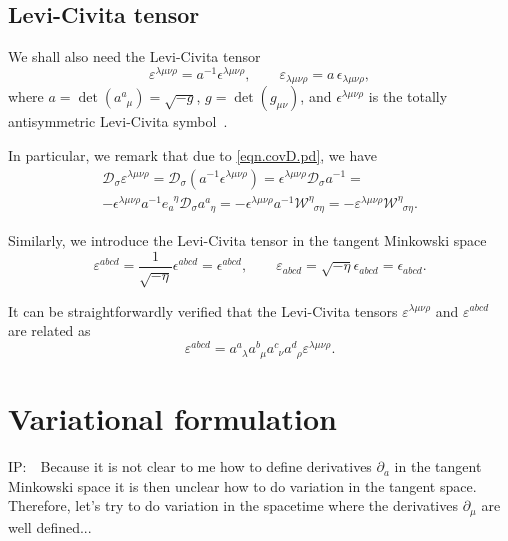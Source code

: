 \documentclass[
10pt, %
a4paper, %
oneside, %
headinclude,footinclude, %
BCOR5mm, %
]{scrartcl}
\newcommand{\IP}[1]{{\color{Red}IP:\ \ #1}}
\newcommand{\pd}{\partial}
\newcommand{\itetr}[2]{e^{\phantom{#2}#1}_{#2}}
\newcommand{\tetr}[2]{a^{#1}_{\phantom{#1}#2}}
\newcommand{\D}[1]{\mathcal{D}_{#1}} %
\newcommand{\W}[2]{\mathcal{W}^{#1}_{\phantom{#1}#2}}
\newcommand{\veps}{\varepsilon}
\begin{document}
\subsection{Levi-Civita tensor}
We shall also need the Levi-Civita tensor
\begin{equation}\label{def.LeviCivita}
\veps^{\lambda\mu\nu\rho} = a^{-1} \epsilon^{\lambda\mu\nu\rho}, \qquad \veps_{\lambda\mu\nu\rho} = 
a \, \epsilon_{\lambda\mu\nu\rho},
\end{equation}
where $ a = \det(\tetr{a}{\mu}) = \sqrt{-g}$, $ g = \det(g_{\mu\nu}) $, and $ 
\epsilon^{{\lambda\mu\nu\rho}} $ is the totally antisymmetric Levi-Civita 
symbol~\cite{AldrovandiPereiraBook}.


In particular, we remark that due to \eqref{eqn.covD.pd}, we have
\begin{multline}\label{eqn.diff.LeviCivita}
\D{\sigma}\veps^{\lambda\mu\nu\rho} = \D{\sigma}(a^{-1}\epsilon^{\lambda\mu\nu\rho}) = 
\epsilon^{\lambda\mu\nu\rho}\D{\sigma}a^{-1} = 
\\
-\epsilon^{\lambda\mu\nu\rho}a^{-1}\itetr{\eta}{a}\D{\sigma}\tetr{a}{\eta} = 
-\epsilon^{\lambda\mu\nu\rho}a^{-1}\W{\eta}{\sigma\eta} = 
-\veps^{\lambda\mu\nu\rho}\W{\eta}{\sigma\eta} . 
\end{multline}

Similarly, we introduce the Levi-Civita tensor in the tangent Minkowski space
\begin{equation}
\veps^{abcd} =\frac{1}{ \sqrt{-\eta}}\epsilon^{abcd} = \epsilon^{abcd}, \qquad \veps_{abcd} = 
\sqrt{-\eta}\epsilon_{abcd} = \epsilon_{abcd}.
\end{equation}

It can be straightforwardly verified that the Levi-Civita tensors $ \veps^{\lambda\mu\nu\rho} $ and 
$ \veps^{abcd} $ are 
related as
\begin{equation}
\veps^{abcd} = \tetr{a}{\lambda}\tetr{b}{\mu}\tetr{c}{\nu}\tetr{d}{\rho}\veps^{\lambda\mu\nu\rho}.
\end{equation}


\section{Variational formulation}

\IP{Because it is not clear to me how to define derivatives $ \pd_a $ in the tangent Minkowski 
space it is then unclear how to do variation in the tangent space. Therefore, let's try to do 
variation in the spacetime 
where the derivatives $ \pd_\mu $ are well defined...}
\end{document}
